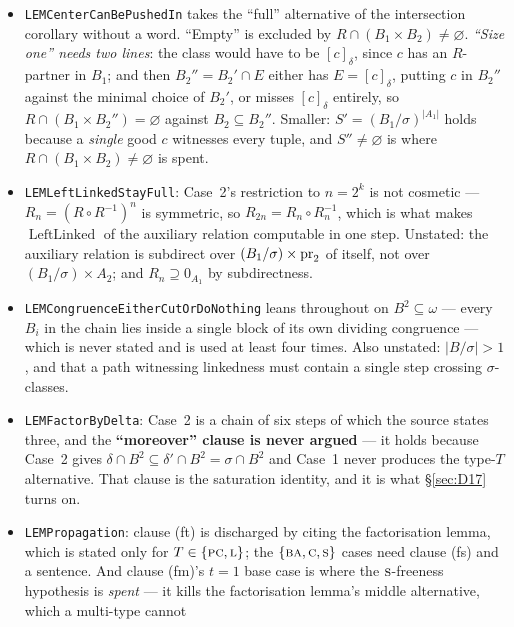 \begin{itemize}\tightlist
\item \texttt{LEMCenterCanBePushedIn} takes the ``full'' alternative of the
  intersection corollary without a word. ``Empty'' is excluded by
  $R\cap(B_{1}\times B_{2})\neq\varnothing$. \emph{``Size one'' needs two
  lines}: the class would have to be $[c]_{\delta}$, since $c$ has an
  $R$-partner in $B_{1}$; and then $B_{2}''=B_{2}'\cap E$ either has
  $E=[c]_{\delta}$, putting $c$ in $B_{2}''$ against the minimal choice of
  $B_{2}'$, or misses $[c]_{\delta}$ entirely, so $R\cap(B_{1}\times B_{2}'')=
  \varnothing$ against $B_{2}\subseteq B_{2}''$. Smaller: $S'=(B_{1}/\sigma)^{
  |A_{1}|}$ holds because a \emph{single} good $c$ witnesses every tuple, and
  $S''\neq\varnothing$ is where $R\cap(B_{1}\times B_{2})\neq\varnothing$ is
  spent.
\item \texttt{LEMLeftLinkedStayFull}: Case~2's restriction to $n=2^{k}$ is not
  cosmetic --- $R_{n}=(R\circ R^{-1})^{n}$ is symmetric, so
  $R_{2n}=R_{n}\circ R_{n}^{-1}$, which is what makes
  $\operatorname{LeftLinked}$ of the auxiliary relation computable in one step.
  Unstated: the auxiliary relation is subdirect over
  $(B_{1}/\sigma)\times\operatorname*{pr}_{2}$ of itself, not over $(B_{1}/\sigma)\times
  A_{2}$; and $R_{n}\supseteq0_{A_{1}}$ by subdirectness.
\item \texttt{LEMCongruenceEitherCutOrDoNothing} leans throughout on
  $B^{2}\subseteq\omega$ --- every $B_{i}$ in the chain lies inside a single
  block of its own dividing congruence --- which is never stated and is used at
  least four times. Also unstated: $|B/\sigma|>1$, and that a path witnessing
  linkedness must contain a single step crossing $\sigma$-classes.
\item \texttt{LEMFactorByDelta}: Case~2 is a chain of six steps of which the
  source states three, and the \textbf{``moreover'' clause is never argued} ---
  it holds because Case~2 gives $\delta\cap B^{2}\subseteq\delta'\cap B^{2}=
  \sigma\cap B^{2}$ and Case~1 never produces the type-$T$ alternative. That
  clause is the saturation identity, and it is what \S\ref{sec:D17} turns on.
\item \texttt{LEMPropagation}: clause (ft) is discharged by citing the
  factorisation lemma, which is stated only for $T\in\{\textup{\textsc{pc}},\textup{\textsc{l}}\}$; the
  $\{\textup{\textsc{ba}},\textup{\textsc{c}},\textup{\textsc{s}}\}$ cases need clause (fs) and a sentence. And clause (fm)'s
  $t=1$ base case is where the $\textup{\textsc{s}}$-freeness hypothesis is \emph{spent} --- it
  kills the factorisation lemma's middle alternative, which a multi-type cannot

\end{itemize}
